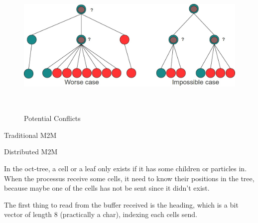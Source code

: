 \documentclass[12pt,letterpaper,titlepage]{report}
\begin{document}
\begin{figure}[h!]
  \begin{center}
    \includegraphics[width=14cm, height=7cm, keepaspectratio=true]{Images/ruleillu.jpg}
    \caption{Potential Conflicts}
  \end{center}
\end{figure}

\begin{algorithm}[H]
  \LinesNumbered
  \SetAlgoLined
  \BlankLine
  \BlankLine
  \caption{Traditional M2M}
\end{algorithm}
\begin{algorithm}[H]
  \LinesNumbered
  \SetAlgoLined
  \BlankLine
  \BlankLine
  \caption{Distributed M2M}
\end{algorithm}

In the oct-tree, a cell or a leaf only exists if it has some children
or particles in. When the processus receive some cells, it need to
know their positions in the tree, because maybe one of the cells has
not be sent since it didn't exist.

The first thing to read from the buffer received is the heading, which
is a bit vector of length 8 (practically a char), indexing each cells
send.
\end{document}
